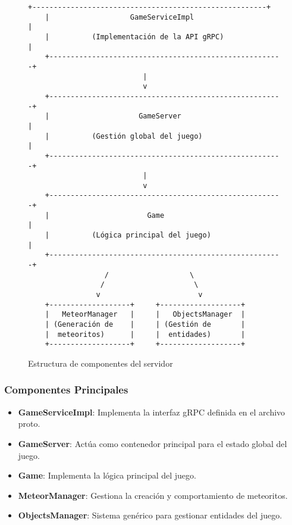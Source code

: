 \documentclass[11pt,letterpaper]{article}
\begin{document}
\begin{figure}[H]
    \centering
    \begin{lstlisting}[language=text]
    +-------------------------------------------------------+
    |                   GameServiceImpl                     |
    |          (Implementación de la API gRPC)              |
    +-------------------------------------------------------+
                           |
                           v
    +-------------------------------------------------------+
    |                     GameServer                        |
    |          (Gestión global del juego)                   |
    +-------------------------------------------------------+
                           |
                           v
    +-------------------------------------------------------+
    |                       Game                            |
    |          (Lógica principal del juego)                 |
    +-------------------------------------------------------+
                  /                   \
                 /                     \
                v                       v
    +-------------------+     +-------------------+
    |   MeteorManager   |     |   ObjectsManager  |
    | (Generación de    |     | (Gestión de       |
    |  meteoritos)      |     |  entidades)       |
    +-------------------+     +-------------------+
    \end{lstlisting}
    \caption{Estructura de componentes del servidor}
\end{figure}

\subsubsection{Componentes Principales}

\begin{itemize}
    \item \textbf{GameServiceImpl}: Implementa la interfaz gRPC definida en el archivo proto.
    
    \item \textbf{GameServer}: Actúa como contenedor principal para el estado global del juego.
    
    \item \textbf{Game}: Implementa la lógica principal del juego.
    
    \item \textbf{MeteorManager}: Gestiona la creación y comportamiento de meteoritos.
    
    \item \textbf{ObjectsManager}: Sistema genérico para gestionar entidades del juego.
\end{itemize}
\end{document}
